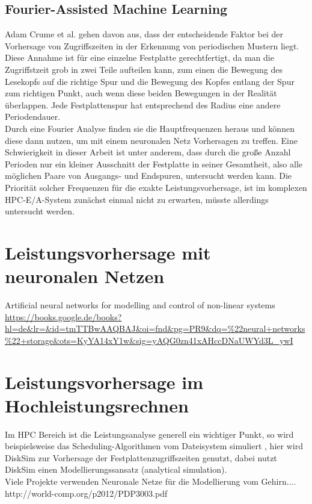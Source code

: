 \documentclass[
	12pt,
	a4paper,
	BCOR10mm,
	DIV14,
	listof=totoc,
	bibliography=totoc,
	headsepline
]{scrreprt}
\begin{document}
\subsection{Fourier-Assisted Machine Learning}
Adam Crume et al. \cite{Crume:2013:FML:2538542.2538561} gehen davon aus, dass der entscheidende Faktor bei der Vorhersage von Zugriffszeiten in der Erkennung von periodischen Mustern liegt. Diese Annahme ist für eine einzelne Festplatte gerechtfertigt, da man die Zugriffstzeit grob in zwei Teile aufteilen kann, zum einen die Bewegung des Lesekopfs auf die richtige Spur und die Bewegung des Kopfes entlang der Spur zum richtigen Punkt, auch wenn diese beiden Bewegungen in der Realität überlappen. Jede Festplattenspur hat entsprechend des Radius eine andere Periodendauer.\\
Durch eine Fourier Analyse finden sie die Hauptfrequenzen heraus und können diese dann nutzen, um mit einem neuronalen Netz Vorhersagen zu treffen.
Eine Schwierigkeit in dieser Arbeit ist unter anderem, dass durch die große Anzahl Perioden nur ein kleiner Ausschnitt der Festplatte in seiner Gesamtheit, also alle möglichen Paare von Ausgangs- und Endspuren, untersucht werden kann. Die Priorität solcher Frequenzen für die exakte Leistungsvorhersage, ist im komplexen HPC-E/A-System zunächst einmal nicht zu erwarten, müsste allerdings untersucht werden.

\section{Leistungsvorhersage mit neuronalen Netzen}
Artificial neural networks for modelling and control of non-linear systems
\url{https://books.google.de/books?hl=de&lr=&id=tmTTBwAAQBAJ&oi=fnd&pg=PR9&dq=%22neural+networks%22+storage&ots=KyYA14xY1w&sig=yAQG0zn41xAHccDNaUWYd3L_ywI}


\section{Leistungsvorhersage im Hochleistungsrechnen}

	Im HPC Bereich ist die Leistungsanalyse generell ein wichtiger Punkt, so wird beispielsweise das Scheduling-Algorithmen vom Dateisystem simuliert \cite{Liu_towardssimulation}, hier wird DiskSim \cite{Bucy08thedisksim} zur Vorhersage der Festplattenzugriffszeiten genutzt, dabei nutzt DiskSim einen Modellierungssansatz (analytical simulation). \\

Viele Projekte verwenden Neuronale Netze für die Modellierung vom Gehirn....
http://world-comp.org/p2012/PDP3003.pdf
\end{document}
